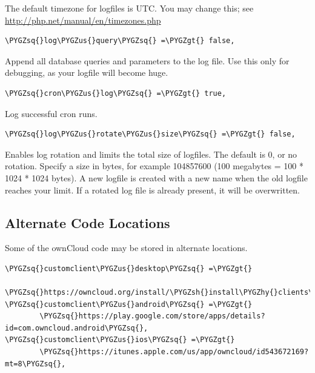 \documentclass[letterpaper,10pt,english]{sphinxmanual}
\def\PYGZus{\char`\_}
\def\PYGZgt{\char`\>}
\def\PYGZsh{\char`\#}
\def\PYGZhy{\char`\-}
\def\PYGZsq{\char`\'}
\renewcommand\PYGZsq{\textquotesingle}
\begin{document}
The default timezone for logfiles is UTC. You may change this; see
\href{http://php.net/manual/en/timezones.php}{http://php.net/manual/en/timezones.php}

\begin{Verbatim}[commandchars=\\\{\}]
\PYGZsq{}log\PYGZus{}query\PYGZsq{} =\PYGZgt{} false,
\end{Verbatim}

Append all database queries and parameters to the log file. Use this only for
debugging, as your logfile will become huge.

\begin{Verbatim}[commandchars=\\\{\}]
\PYGZsq{}cron\PYGZus{}log\PYGZsq{} =\PYGZgt{} true,
\end{Verbatim}

Log successful cron runs.

\begin{Verbatim}[commandchars=\\\{\}]
\PYGZsq{}log\PYGZus{}rotate\PYGZus{}size\PYGZsq{} =\PYGZgt{} false,
\end{Verbatim}

Enables log rotation and limits the total size of logfiles. The default is 0,
or no rotation. Specify a size in bytes, for example 104857600 (100 megabytes
= 100 * 1024 * 1024 bytes). A new logfile is created with a new name when the
old logfile reaches your limit. If a rotated log file is already present, it
will be overwritten.


\subsection{Alternate Code Locations}
\label{configuration_server/config_sample_php_parameters:alternate-code-locations}
Some of the ownCloud code may be stored in alternate locations.

\begin{Verbatim}[commandchars=\\\{\}]
\PYGZsq{}customclient\PYGZus{}desktop\PYGZsq{} =\PYGZgt{}
        \PYGZsq{}https://owncloud.org/install/\PYGZsh{}install\PYGZhy{}clients\PYGZsq{},
\PYGZsq{}customclient\PYGZus{}android\PYGZsq{} =\PYGZgt{}
        \PYGZsq{}https://play.google.com/store/apps/details?id=com.owncloud.android\PYGZsq{},
\PYGZsq{}customclient\PYGZus{}ios\PYGZsq{} =\PYGZgt{}
        \PYGZsq{}https://itunes.apple.com/us/app/owncloud/id543672169?mt=8\PYGZsq{},
\end{Verbatim}
\end{document}
